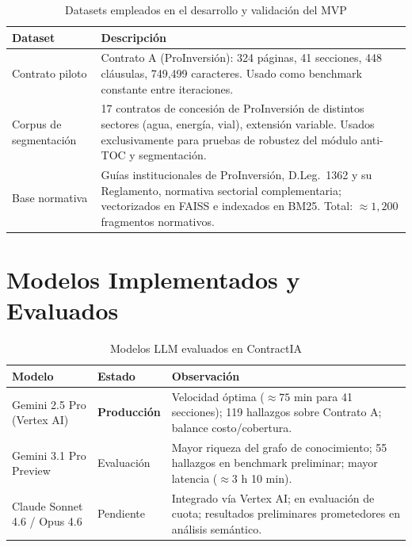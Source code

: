 \begin{table}[H]
\centering
\caption{Datasets empleados en el desarrollo y validación del MVP}
\label{tab:datasets}
\begin{tabular}{p{3.5cm} p{9.5cm}}
\toprule
\textbf{Dataset} & \textbf{Descripción} \\
\midrule
Contrato piloto &
    Contrato A (ProInversión): 324 páginas, 41 secciones,
    448 cláusulas, 749{,}499 caracteres. Usado como benchmark
    constante entre iteraciones. \\
Corpus de segmentación &
    17 contratos de concesión de ProInversión de distintos sectores
    (agua, energía, vial), extensión variable. Usados exclusivamente
    para pruebas de robustez del módulo anti-TOC y segmentación. \\
Base normativa &
    Guías institucionales de ProInversión, D.Leg.\ 1362 y su
    Reglamento, normativa sectorial complementaria; vectorizados
    en FAISS e indexados en BM25. Total: $\approx 1{,}200$ fragmentos
    normativos. \\
\bottomrule
\end{tabular}
\end{table}

\section{Modelos Implementados y Evaluados}

\begin{table}[H]
\centering
\caption{Modelos LLM evaluados en ContractIA}
\label{tab:modelos}
\begin{tabular}{p{3.8cm} p{2.5cm} p{6.5cm}}
\toprule
\textbf{Modelo} & \textbf{Estado} & \textbf{Observación} \\
\midrule
Gemini 2.5 Pro (Vertex AI) & \textbf{Producción} &
    Velocidad óptima ($\approx 75$ min para 41 secciones); 119
    hallazgos sobre Contrato A; balance costo/cobertura. \\
Gemini 3.1 Pro Preview      & Evaluación &
    Mayor riqueza del grafo de conocimiento; 55 hallazgos en
    benchmark preliminar; mayor latencia ($\approx 3$ h 10 min). \\
Claude Sonnet 4.6 / Opus 4.6 & Pendiente &
    Integrado vía Vertex AI; en evaluación de cuota; resultados
    preliminares prometedores en análisis semántico. \\
\bottomrule
\end{tabular}
\end{table}

